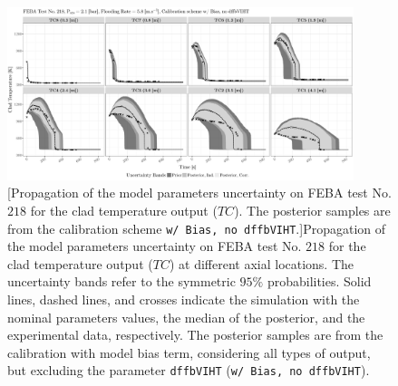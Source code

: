 \clearpage
\begin{figure}
	\centering
	\includegraphics[width=0.90\textwidth]{../figures/chapter5/figures/plotTraceUQPosteriorAllDiscCenteredNoParam8TC218}
		[Propagation of the model parameters uncertainty on FEBA test No. $218$ for the clad temperature output ($TC$). The posterior samples are from the calibration scheme \texttt{w/ Bias, no dffbVIHT}.]{Propagation of the model parameters uncertainty on FEBA test No. $218$ for the clad temperature output ($TC$) at different axial locations. The uncertainty bands refer to the symmetric $95\%$ probabilities. Solid lines, dashed lines, and crosses indicate the simulation with the nominal parameters values, the median of the posterior, and the experimental data, respectively. The posterior samples are from the calibration with model bias term, considering all types of output, but excluding the parameter \texttt{dffbVIHT} (\texttt{w/ Bias, no dffbVIHT}).}
	\label{fig:ch5_plot_trace_uq_post_tc_218_noparam8}
\end{figure}
\clearpage

